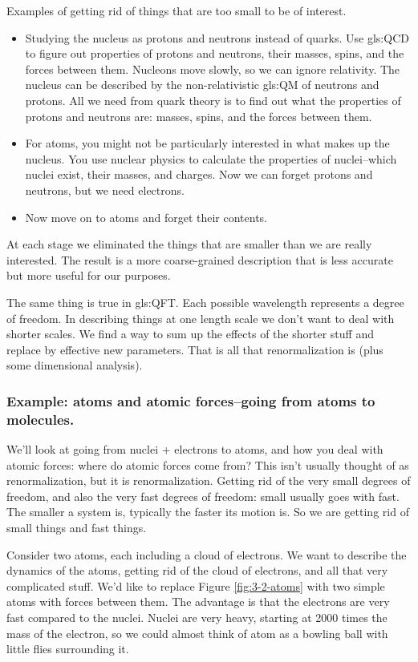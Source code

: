 \documentclass[]{article}
\begin{document}
Examples of getting rid of things that are too small to be of interest.
\begin{itemize}
	\item Studying the nucleus as protons and neutrons instead of quarks. Use \gls{gls:QCD} to figure out properties of protons and neutrons, their masses, spins,  and the forces between them. Nucleons move slowly, so we can ignore relativity. The nucleus can be described by the non-relativistic \glsdesc{gls:QM} of neutrons and protons. All we need from quark theory is to find out what the properties of protons and neutrons are: masses, spins, and the forces between them.
	\item For atoms, you might not be particularly interested in what makes up the nucleus. You use nuclear physics to calculate the properties of nuclei--which nuclei exist, their masses, and charges. Now we can forget protons and neutrons, but we need electrons.
	\item Now move on to atoms and forget their contents.
\end{itemize}

At each stage we eliminated the things that are smaller than we are really interested. The result is a more coarse-grained description that is less accurate but more useful for our purposes.

The same thing is true in \glsdesc{gls:QFT}. Each possible wavelength represents a degree of freedom. In describing things at one length scale we don't want to deal with shorter scales. We find a way to sum up the effects of the shorter stuff and replace by effective new parameters. That is all that renormalization is (plus some dimensional analysis).

\subsubsection{Example: atoms and atomic forces--going from atoms to molecules.}

We'll look at going from nuclei + electrons to atoms, and how you deal with atomic forces: where do atomic forces come from? This isn't usually thought of as renormalization, but it is renormalization. Getting rid of the very small degrees of freedom, and also the very fast degrees of freedom: small usually goes with fast. The smaller a system is, typically the faster its motion is. So we are getting rid of small things and fast things.

Consider two atoms, each including a cloud of electrons. We want to describe the dynamics of the atoms, getting rid of the cloud of electrons, and all that very complicated stuff. We'd like to replace Figure \ref{fig:3-2-atoms} with two simple atoms with forces between them. The advantage is that the electrons are very fast compared to the nuclei. Nuclei are very heavy, starting at 2000 times the mass of the electron, so we could almost think of atom as a bowling ball with little flies surrounding it.
\end{document}

